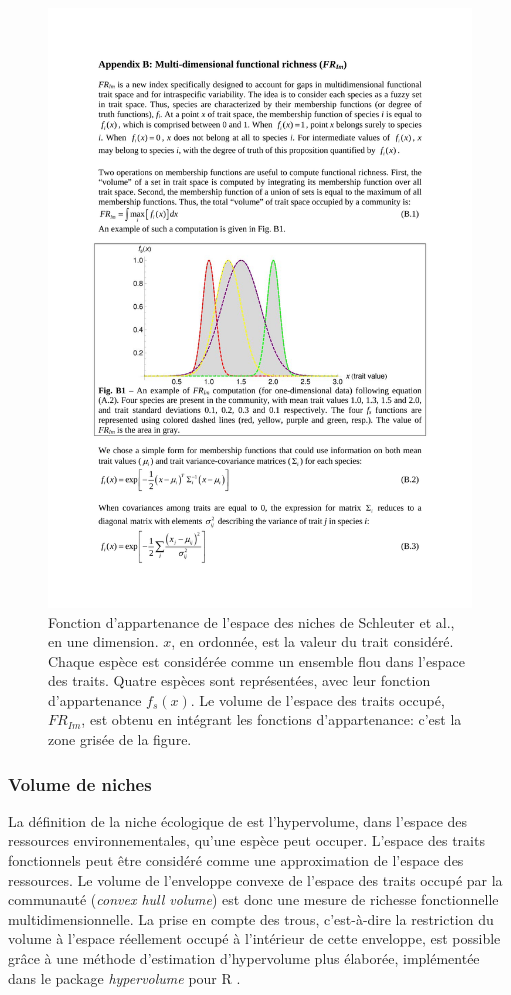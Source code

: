 \documentclass[
  11pt,
  french,
  a4paper,
  extrafontsizes,onecolumn,openright
  ]{memoir}
\begin{document}
\begin{figure}

{\centering \includegraphics[width=0.8\linewidth]{images/Schleuter2010} 

}

\caption{Fonction d'appartenance de l'espace des niches de Schleuter et al., en une dimension. \(x\), en ordonnée, est la valeur du trait considéré. Chaque espèce est considérée comme un ensemble flou dans l'espace des traits. Quatre espèces sont représentées, avec leur fonction d'appartenance \(f_s(x)\). Le volume de l'espace des traits occupé, \(\mathit{FR}_{Im}\), est obtenu en intégrant les fonctions d'appartenance: c'est la zone grisée de la figure.}\label{fig:Schleuter2010}
\end{figure}

\normalsize

\hypertarget{volume-de-niches}{%
\subsubsection{Volume de niches}\label{volume-de-niches}}

La définition de la niche écologique de \textcite{Hutchinson1957} est l'hypervolume, dans l'espace des ressources environnementales, qu'une espèce peut occuper.
L'espace des traits fonctionnels peut être considéré comme une approximation de l'espace des ressources.
Le volume de l'enveloppe convexe de l'espace des traits occupé par la communauté (\emph{convex hull volume}) est donc une mesure de richesse fonctionnelle multidimensionnelle.
La prise en compte des trous, c'est-à-dire la restriction du volume à l'espace réellement occupé à l'intérieur de cette enveloppe, est possible grâce à une méthode d'estimation d'hypervolume plus élaborée, implémentée dans le package \emph{hypervolume} pour R \autocite{Blonder2014}.
\end{document}
